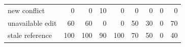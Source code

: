 \begin{tabular}{lrrrrrrrr}
new conflict & \cellcolor[gray]{1.00}0 & \cellcolor[gray]{1.00}0 & \cellcolor[gray]{0.96}10 & \cellcolor[gray]{1.00}0 & \cellcolor[gray]{1.00}0 & \cellcolor[gray]{1.00}0 & \cellcolor[gray]{1.00}0 & \cellcolor[gray]{1.00}0 \\
unavailable edit & \cellcolor[gray]{0.79}60 & \cellcolor[gray]{0.79}60 & \cellcolor[gray]{1.00}0 & \cellcolor[gray]{1.00}0 & \cellcolor[gray]{0.82}50 & \cellcolor[gray]{0.90}30 & \cellcolor[gray]{1.00}0 & \cellcolor[gray]{0.76}70 \\
stale reference & \cellcolor[gray]{0.65}100 & \cellcolor[gray]{0.65}100 & \cellcolor[gray]{0.69}90 & \cellcolor[gray]{0.65}100 & \cellcolor[gray]{0.76}70 & \cellcolor[gray]{0.82}50 & \cellcolor[gray]{1.00}0 & \cellcolor[gray]{0.86}40 \\
\bottomrule
\end{tabular}
